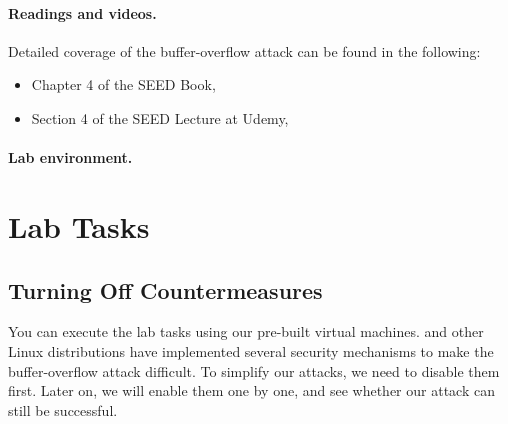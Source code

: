 \noindent
{}



\paragraph{Readings and videos.}
Detailed coverage of the buffer-overflow attack can be found in the following:

\begin{itemize}
\item Chapter 4 of the SEED Book, \seedbook
\item Section 4 of the SEED Lecture at Udemy, \seedcsvideo
\end{itemize}


\paragraph{Lab environment.} \seedenvironment



\newpage
\section{Lab Tasks}

\subsection{Turning Off Countermeasures}

You can execute the lab tasks using our pre-built \ubuntu virtual machines. 
\ubuntu and other Linux distributions have implemented several
security mechanisms to make the buffer-overflow attack difficult. 
To simplify our attacks, we need to disable them first. Later on, we will enable them one by
one, and see whether our attack can still be successful.


